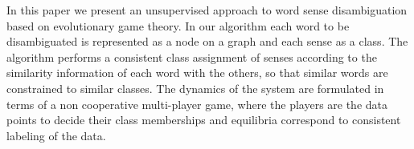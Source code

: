 In this paper we present an unsupervised approach to word sense disambiguation based on evolutionary game theory. In our algorithm each word to be disambiguated is represented as a node on a graph and each sense as a class. The algorithm performs a consistent class assignment of senses according to the similarity information of each word with the others, so that similar words are constrained to similar classes. The dynamics of the system are formulated in terms of a non cooperative multi-player game, where the players are the data points to decide their class memberships and equilibria correspond to consistent labeling of the data.
